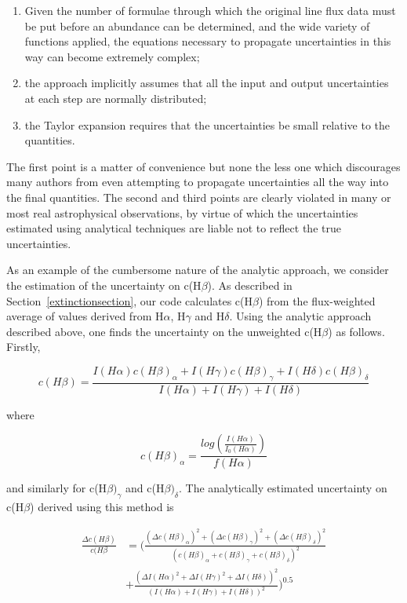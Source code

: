 \documentclass[useAMS,usenatbib]{mn2e}
\begin{document}
\begin{enumerate}
  \item Given the number of formulae through which the original line flux data must be put before an abundance can be determined, and the wide variety of functions applied, the equations necessary to propagate uncertainties in this way can become extremely complex;
  \item the approach implicitly assumes that all the input and output uncertainties at each step are normally distributed;
  \item the Taylor expansion requires that the uncertainties be small relative to the quantities.
\end{enumerate}

The first point is a matter of convenience but none the less one which discourages many authors from even attempting to propagate uncertainties all the way into the final quantities.  The second and third points are clearly violated in many or most real astrophysical observations, by virtue of which the uncertainties estimated using analytical techniques are liable not to reflect the true uncertainties.

As an example of the cumbersome nature of the analytic approach, we consider the estimation of the uncertainty on c(H$\beta$).  As described in Section~\ref{extinctionsection}, our code calculates c(H$\beta$) from the flux-weighted average of values derived from H$\alpha$, H$\gamma$ and H$\delta$.  Using the analytic approach described above, one finds the uncertainty on the unweighted c(H$\beta$) as follows.  Firstly,

\begin{equation}
c(H\beta) = \frac{I(H\alpha)c(H\beta)_\alpha + I(H\gamma)c(H\beta)_\gamma + I(H\delta)c(H\beta)_\delta}{I(H\alpha) + I(H\gamma) + I(H\delta)}
\end{equation}

where

\begin{equation}
c(H\beta)_\alpha = \frac{log\left(\frac{I(H\alpha)}{I_0(H\alpha)}\right)}{f(H\alpha)}
\end{equation}

and similarly for c(H$\beta)_\gamma$ and c(H$\beta)_\delta$.  The analytically estimated uncertainty on c(H$\beta$) derived using this method is

\begin{eqnarray}\nonumber
\frac{\Delta c(H\beta)}{c(H\beta} &= \bigg(\frac{(\Delta c(H\beta)_\alpha)^2 + (\Delta c(H\beta)_\gamma)^2+(\Delta c(H\beta)_\delta)^2}{(c(H\beta)_\alpha + c(H\beta)_\gamma + c(H\beta)_\delta)^2}\\
&+ \frac{(\Delta I(H\alpha)^2 + \Delta I(H\gamma)^2 + \Delta I(H\delta))^2}{(I(H\alpha) + I(H\gamma) + I(H\delta))^2}\bigg)^{0.5}
\end{eqnarray}
\end{document}
